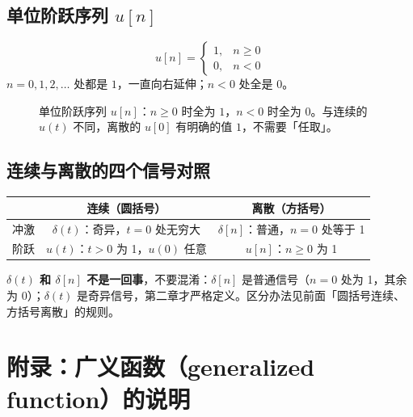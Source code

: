 \documentclass[UTF8,a4paper,11pt]{ctexart}
\newcounter{ex}[section]
\begin{document}
\subsection{\texorpdfstring{单位阶跃序列 $u[n]$}{单位阶跃序列 u[n]}}
\[
u[n]=\begin{cases}1,&n\ge0\\0,&n<0\end{cases}
\]
$n=0,1,2,\dots$ 处都是 $1$，一直向右延伸；$n<0$ 处全是 $0$。

\begin{figure}[H]
\centering
{}
\caption{单位阶跃序列 $u[n]$：$n\ge0$ 时全为 $1$，$n<0$ 时全为 $0$。与连续的 $u(t)$ 不同，离散的 $u[0]$ 有明确的值 $1$，不需要「任取」。}
\end{figure}

\subsection{连续与离散的四个信号对照}
\begin{center}
\begin{tabular}{lcc}
\toprule
 & 连续（圆括号） & 离散（方括号）\\
\midrule
冲激 & $\delta(t)$：奇异，$t=0$ 处无穷大 & $\delta[n]$：普通，$n=0$ 处等于 1\\
阶跃 & $u(t)$：$t>0$ 为 1，$u(0)$ 任意 & $u[n]$：$n\ge0$ 为 1\\
\bottomrule
\end{tabular}
\end{center}
\textbf{$\delta(t)$ 和 $\delta[n]$ 不是一回事}，不要混淆：$\delta[n]$ 是普通信号（$n=0$ 处为 1，其余为 0）；$\delta(t)$ 是奇异信号，第二章才严格定义。区分办法见前面「圆括号连续、方括号离散」的规则。

\appendix
\section{附录：广义函数（generalized function）的说明}
\end{document}

